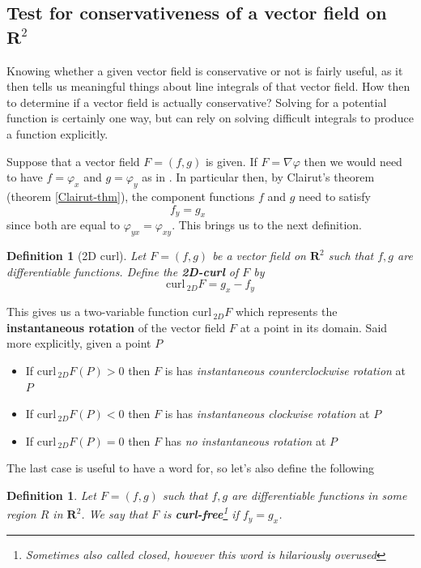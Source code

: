 \documentclass[12pt]{article}
\numberwithin{equation}{subsection}
\numberwithin{figure}{subsection}
\newtheorem{defn}[subsection]{Definition}
\theoremstyle{note}
\newcommand{\curl}{\mathrm{curl\,}}
\begin{document}
{\subsection{Test for conservativeness of a vector field on $\mathbf{R}^2$} Knowing whether a given vector field is conservative or not is fairly useful, as it then tells us meaningful things about line integrals of that vector field. How then to determine if a vector field is actually conservative? Solving for a potential function is certainly one way, but can rely on solving difficult integrals to produce a function explicitly.

Suppose that a vector field $F=(f,g)$ is given. If $F=\nabla \varphi$ then we would need to have $f=\varphi_x$ and $g=\varphi_y$ as in . In particular then, by Clairut's theorem (theorem \ref{Clairut-thm}), the component functions $f$ and $g$ need to satisfy \begin{equation} \label{curl-free} f_y=g_x \qquad \qquad\end{equation} since both are equal to $\varphi_{yx}=\varphi_{xy}$. 
This brings us to the next definition.

\begin{defn}[2D curl]Let $F=(f,g)$ be a vector field on $\mathbf{R}^2$ such that $f,g$ are differentiable functions. Define the \textbf{2D-curl} of $F$ by \begin{equation} \curl_{2D} F=g_x-f_y\end{equation}\end{defn}

This gives us a two-variable function $\curl_{2D} F$ which represents the \textbf{instantaneous rotation} of the vector field $F$ at a point in its domain. Said more explicitly, given a point $P$ 
\begin{itemize}
	\item If $\curl_{2D}F(P)>0$ then $F$ is has \textit{instantaneous counterclockwise rotation} at $P$
	\item If $\curl_{2D}F(P)<0$ then $F$ is has \textit{instantaneous clockwise rotation} at $P$
	\item If $\curl_{2D}F(P)=0$ then $F$ has \textit{no instantaneous rotation} at $P$
\end{itemize}
The last case is useful to have a word for, so let's also define the following
\begin{defn} \label{def-curl-free} Let $F=(f,g)$ such that $f,g$ are differentiable functions in some region $R$ in $\mathbf{R}^2$. We say that $F$ is \textbf{curl-free}\footnote{Sometimes also called \textit{closed}, however this word is hilariously overused} if $f_y=g_x$. 
\end{defn}

}
\end{document}
